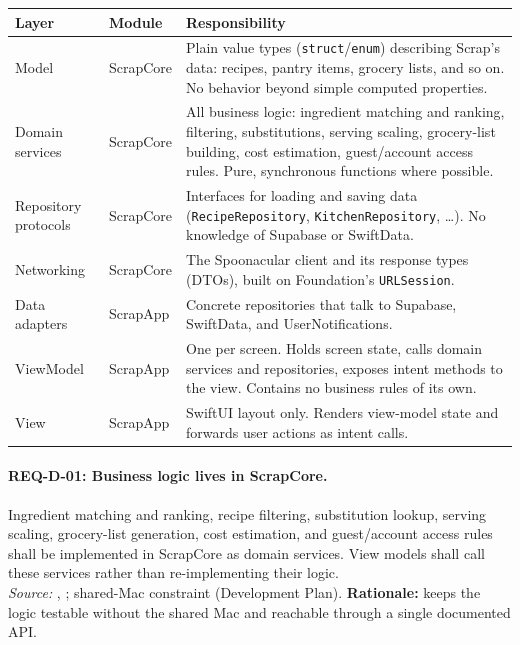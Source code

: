 {\small\begin{tabularx}{\textwidth}{@{}L{2.6cm}L{2.2cm}Y@{}}
\toprule
\textbf{Layer} & \textbf{Module} & \textbf{Responsibility} \\
\midrule
Model & ScrapCore & Plain value types (\texttt{struct}/\texttt{enum}) describing Scrap's data: recipes, pantry items, grocery lists, and so on. No behavior beyond simple computed properties. \\
Domain services & ScrapCore & All business logic: ingredient matching and ranking, filtering, substitutions, serving scaling, grocery-list building, cost estimation, guest/account access rules. Pure, synchronous functions where possible. \\
Repository protocols & ScrapCore & Interfaces for loading and saving data (\texttt{RecipeRepository}, \texttt{KitchenRepository}, \dots). No knowledge of Supabase or SwiftData. \\
Networking & ScrapCore & The Spoonacular client and its response types (DTOs), built on Foundation's \texttt{URLSession}. \\
Data adapters & ScrapApp & Concrete repositories that talk to Supabase, SwiftData, and UserNotifications. \\
ViewModel & ScrapApp & One per screen. Holds screen state, calls domain services and repositories, exposes intent methods to the view. Contains no business rules of its own. \\
View & ScrapApp & SwiftUI layout only. Renders view-model state and forwards user actions as intent calls. \\
\bottomrule
\end{tabularx}}

\paragraph{REQ-D-01: Business logic lives in ScrapCore.}
 Ingredient matching and ranking, recipe filtering, substitution lookup, serving scaling, grocery-list generation, cost estimation, and guest/account access rules shall be implemented in ScrapCore as domain services. View models shall call these services rather than re-implementing their logic.\\
\textit{Source:} , ; shared-Mac constraint (Development Plan). \textbf{Rationale:} keeps the logic testable without the shared Mac and reachable through a single documented API.

